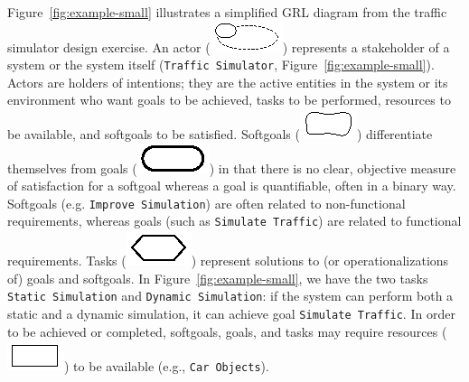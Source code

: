 Figure~\ref{fig:example-small} illustrates a simplified GRL diagram from the traffic simulator design exercise. An actor (\includegraphics[scale=1]{img/actor}) represents a stakeholder of a system or the system itself (\texttt{Traffic Simulator}, Figure~\ref{fig:example-small}). Actors are holders of intentions; they are the active entities in the system or its environment who want goals to be achieved, tasks to be performed, resources to be available, and softgoals to be satisfied. Softgoals (\includegraphics[scale=1]{img/softgoal}) differentiate themselves from goals (\includegraphics[scale=1]{img/goal}) in that there is no clear, objective measure of satisfaction for a softgoal whereas a goal is quantifiable, often in a binary way. Softgoals (e.g. \texttt{Improve Simulation}) are often related to non-functional requirements, whereas goals (such as  \texttt{Simulate Traffic}) are related to functional requirements. Tasks (\includegraphics[scale=1]{img/task}) represent solutions to (or operationalizations of) goals and softgoals. In Figure~\ref{fig:example-small}, we have the two tasks \texttt{Static Simulation} and \texttt{Dynamic Simulation}: if the system can perform both a static and a dynamic simulation, it can achieve goal \texttt{Simulate Traffic}. In order to be achieved or completed, softgoals, goals, and tasks may require resources (\includegraphics[scale=1]{img/resource}) to be available (e.g., \texttt{Car Objects}). 

